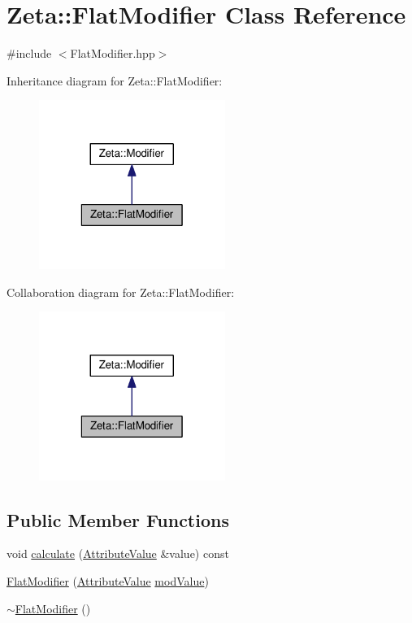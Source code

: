 \hypertarget{classZeta_1_1FlatModifier}{\section{Zeta\+:\+:Flat\+Modifier Class Reference}
\label{classZeta_1_1FlatModifier}
}


{\ttfamily \#include $<$Flat\+Modifier.\+hpp$>$}



Inheritance diagram for Zeta\+:\+:Flat\+Modifier\+:\nopagebreak
\begin{figure}[H]
\begin{center}
\leavevmode
\includegraphics[width=172pt]{classZeta_1_1FlatModifier__inherit__graph}
\end{center}
\end{figure}


Collaboration diagram for Zeta\+:\+:Flat\+Modifier\+:\nopagebreak
\begin{figure}[H]
\begin{center}
\leavevmode
\includegraphics[width=172pt]{classZeta_1_1FlatModifier__coll__graph}
\end{center}
\end{figure}
\subsection*{Public Member Functions}
\begin{DoxyCompactItemize}
\item 
void \hyperlink{classZeta_1_1FlatModifier_a2d19ec8d276a43036d3e92462fda7de4}{calculate} (\hyperlink{namespaceZeta_ab5947f98c0ab6302b51f8c6e93ec5581}{Attribute\+Value} \&value) const 
\item 
\hyperlink{classZeta_1_1FlatModifier_a6f8cfbcba966a8e13f61f03430d04fd7}{Flat\+Modifier} (\hyperlink{namespaceZeta_ab5947f98c0ab6302b51f8c6e93ec5581}{Attribute\+Value} \hyperlink{classZeta_1_1Modifier_ae9685e22722b0aaae9edd1a074a6251d}{mod\+Value})
\item 
\hyperlink{classZeta_1_1FlatModifier_a3e7e3c24eabcb5072e9dabd1c6d685a4}{$\sim$\+Flat\+Modifier} ()
\end{DoxyCompactItemize}
